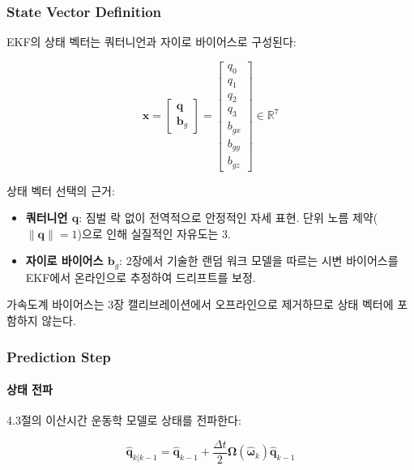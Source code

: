 \subsubsection{State Vector Definition}

EKF의 상태 벡터는 쿼터니언과 자이로 바이어스로 구성된다:

\begin{equation}
    \mathbf{x} = \begin{bmatrix} \mathbf{q} \\ \mathbf{b}_g \end{bmatrix} =
    \begin{bmatrix} q_0 \\ q_1 \\ q_2 \\ q_3 \\ b_{gx} \\ b_{gy} \\ b_{gz} \end{bmatrix} \in \mathbb{R}^7
    \label{eq:ekf_state}
\end{equation}

상태 벡터 선택의 근거:
\begin{itemize}
    \item \textbf{쿼터니언 $\mathbf{q}$}: 짐벌 락 없이 전역적으로 안정적인 자세 표현.
          단위 노름 제약($\|\mathbf{q}\| = 1$)으로 인해 실질적인 자유도는 3.
    \item \textbf{자이로 바이어스 $\mathbf{b}_g$}: 2장에서 기술한 랜덤 워크 모델을 따르는
          시변 바이어스를 EKF에서 온라인으로 추정하여 드리프트를 보정.
\end{itemize}

가속도계 바이어스는 3장 캘리브레이션에서 오프라인으로 제거하므로 상태 벡터에 포함하지 않는다.

\subsubsection{Prediction Step}

\paragraph{상태 전파}

4.3절의 이산시간 운동학 모델로 상태를 전파한다:

\begin{equation}
    \hat{\mathbf{q}}_{k|k-1} = \hat{\mathbf{q}}_{k-1} + \frac{\Delta t}{2}\boldsymbol{\Omega}(\hat{\boldsymbol{\omega}}_k)\hat{\mathbf{q}}_{k-1}
    \label{eq:ekf_state_prop}
\end{equation}

